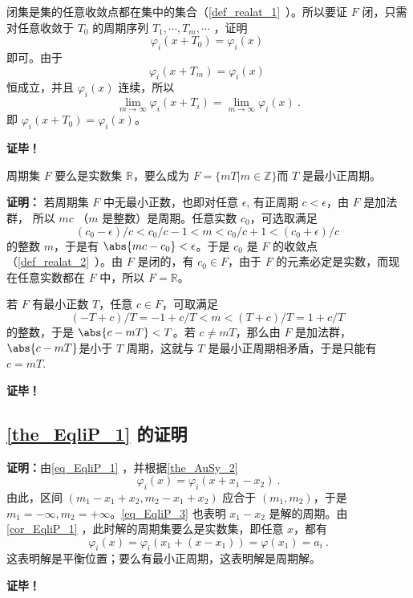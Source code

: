 闭集是集的任意收敛点都在集中的集合（\autoref{def_realat_1}~）。所以要证 $F$ 闭，只需对任意收敛于 $T_0$ 的周期序列 $T_1,\cdots, T_m,\cdots$ ，证明
\begin{equation}
\varphi_i(x+T_0)=\varphi_i(x)~
\end{equation}
即可。由于
\begin{equation}
\varphi_i(x+T_m)=\varphi_i(x)~
\end{equation}
恒成立，并且 $\varphi_i(x)$ 连续，所以
\begin{equation}
\lim_{m\rightarrow\infty}\varphi_i(x+T_i)=\lim_{m\rightarrow\infty}\varphi_i(x)~.
\end{equation}
即 $\varphi_i(x+T_0)=\varphi_i(x)$。

\textbf{证毕！}
\begin{corollary}{}\label{cor_EqliP_1}
周期集 $F$ 要么是实数集 $\mathbb R$，要么成为 $F=\{mT|m\in\mathbb Z\}$而 $T$ 是最小正周期。
\end{corollary}
\textbf{证明：}
若周期集 $F$ 中无最小正数，也即对任意 $\epsilon$, 有正周期 $c<\epsilon$，由 $F$ 是加法群， 所以 $mc$ （$m$ 是整数）是周期。任意实数 $c_0$，可选取满足
\begin{equation}
(c_0-\epsilon)/c<c_0/c-1<m<c_0/c+1<(c_0+\epsilon)/c~
\end{equation}
的整数 $m$，于是有 $\abs{mc-c_0}<\epsilon$。于是 $c_0$ 是 $F$ 的收敛点（\autoref{def_realat_2}~）。由 $F$ 是闭的，有 $c_0\in F$，由于 $F$ 的元素必定是实数，而现在任意实数都在 $F$ 中，所以 $F=\mathbb R$。

若 $F$ 有最小正数 $T$，任意 $c\in F$，可取满足
\begin{equation}
(-T+c)/T=-1+c/T<m<(T+c)/T=1+c/T~
\end{equation}
的整数，于是 $\abs{c-mT}<T$。若 $c\neq mT$，那么由 $F$ 是加法群， $\abs{c-mT}$是小于 $T$ 周期，这就与 $T$ 是最小正周期相矛盾，于是只能有 $c=mT$. 

\textbf{证毕！}

\subsection{\autoref{the_EqliP_1} 的证明}

\textbf{证明：}由\autoref{eq_EqliP_1} ，并根据\autoref{the_AuSy_2}~
\begin{equation}\label{eq_EqliP_3}
\varphi_i(x)=\varphi_i(x+x_1-x_2)~.
\end{equation}
由此，区间 $(m_1-x_1+x_2,m_2-x_1+x_2)$ 应合于 $(m_1,m_2)$，于是 $m_1=-\infty,m_2=+\infty$。\autoref{eq_EqliP_3} 也表明 $x_1-x_2$ 是解的周期。由\autoref{cor_EqliP_1} ，此时解的周期集要么是实数集，即任意 $x$，都有
\begin{equation}
\varphi_i(x)=\varphi_i(x_1+(x-x_1))=\varphi(x_1)=a_i~.
\end{equation}
这表明解是平衡位置；要么有最小正周期，这表明解是周期解。

\textbf{证毕！}












